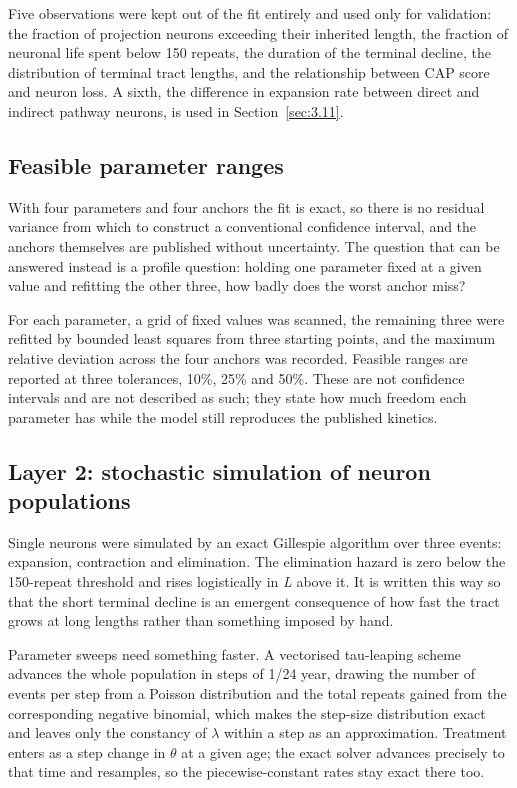 \documentclass[conference]{IEEEtran}
\begin{document}
Five observations were kept out of the fit entirely and used only for validation: the fraction of projection neurons exceeding their inherited length, the fraction of neuronal life spent below 150 repeats, the duration of the terminal decline, the distribution of terminal tract lengths, and the relationship between CAP score and neuron loss. A sixth, the difference in expansion rate between direct and indirect pathway neurons, is used in Section~\ref{sec:3.11}.

\subsection{Feasible parameter ranges}
\label{sec:2.4}
With four parameters and four anchors the fit is exact, so there is no residual variance from which to construct a conventional confidence interval, and the anchors themselves are published without uncertainty. The question that can be answered instead is a profile question: holding one parameter fixed at a given value and refitting the other three, how badly does the worst anchor miss?

For each parameter, a grid of fixed values was scanned, the remaining three were refitted by bounded least squares from three starting points, and the maximum relative deviation across the four anchors was recorded. Feasible ranges are reported at three tolerances, 10\%, 25\% and 50\%. These are not confidence intervals and are not described as such; they state how much freedom each parameter has while the model still reproduces the published kinetics.

\subsection{Layer 2: stochastic simulation of neuron populations}
\label{sec:2.5}
Single neurons were simulated by an exact Gillespie algorithm over three events: expansion, contraction and elimination. The elimination hazard is zero below the 150-repeat threshold and rises logistically in \textit{L} above it. It is written this way so that the short terminal decline is an emergent consequence of how fast the tract grows at long lengths rather than something imposed by hand.

Parameter sweeps need something faster. A vectorised tau-leaping scheme advances the whole population in steps of 1/24 year, drawing the number of events per step from a Poisson distribution and the total repeats gained from the corresponding negative binomial, which makes the step-size distribution exact and leaves only the constancy of $\lambda$ within a step as an approximation. Treatment enters as a step change in $\theta$ at a given age; the exact solver advances precisely to that time and resamples, so the piecewise-constant rates stay exact there too.
\end{document}
